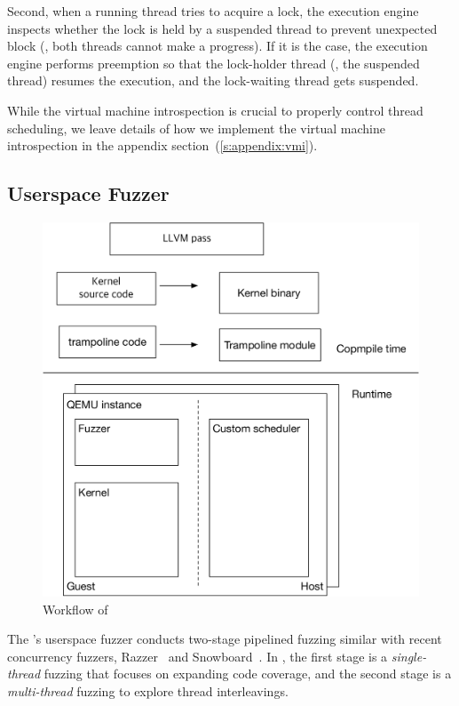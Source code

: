 Second, when a running thread tries to acquire a lock, the execution
engine inspects whether the lock is held by a suspended thread to
prevent unexpected block (\ie, both threads cannot make a progress).
%
If it is the case, the execution engine performs preemption so that
the lock-holder thread (\ie, the suspended thread) resumes the
execution, and the lock-waiting thread gets suspended.


While the virtual machine introspection is crucial to properly control
thread scheduling, we leave details of how we implement the virtual
machine introspection in the appendix
section~(\autoref{s:appendix:vmi}).



\subsection{Userspace Fuzzer}
\label{ss:fuzzer}



\begin{figure}
  \includegraphics[width=0.9\linewidth]{fig/architecture.pdf}
  \caption{Workflow of \sys {}}
  \label{fig:workflow}
\end{figure}


The \sys's userspace fuzzer conducts two-stage pipelined fuzzing
similar with recent concurrency fuzzers, Razzer~\cite{razzer} and
Snowboard~\cite{snowboard}.
%
In \sys, the first stage is a \textit{single-thread} fuzzing that
focuses on expanding code coverage\dr{}, and the second stage is a
\textit{multi-thread} fuzzing to explore thread interleavings.

